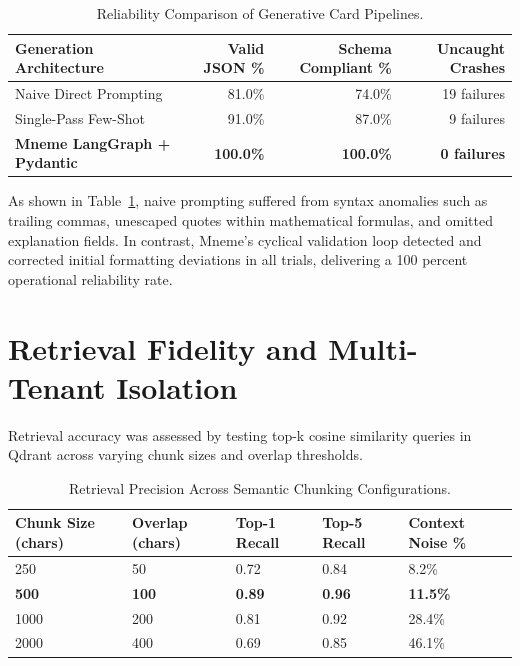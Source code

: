 \documentclass[12pt,a4paper,oneside]{report}
\begin{document}
\begin{table}[H]
\centering
\small
\begin{tabularx}{\textwidth}{Xrrr}
\toprule
\textbf{Generation Architecture} & \textbf{Valid JSON \%} & \textbf{Schema Compliant \%} & \textbf{Uncaught Crashes} \\
\midrule
Naive Direct Prompting & 81.0\% & 74.0\% & 19 failures \\
Single-Pass Few-Shot & 91.0\% & 87.0\% & 9 failures \\
\textbf{Mneme LangGraph + Pydantic} & \textbf{100.0\%} & \textbf{100.0\%} & \textbf{0 failures} \\
\bottomrule
\end{tabularx}
\caption{Reliability Comparison of Generative Card Pipelines.}
\label{tab:schema_reliability}
\end{table}

As shown in Table~\ref{tab:schema_reliability}, naive prompting suffered from syntax anomalies such as trailing commas, unescaped quotes within mathematical formulas, and omitted explanation fields. In contrast, Mneme's cyclical validation loop detected and corrected initial formatting deviations in all trials, delivering a 100 percent operational reliability rate.

\section{Retrieval Fidelity and Multi-Tenant Isolation}
Retrieval accuracy was assessed by testing top-k cosine similarity queries in Qdrant across varying chunk sizes and overlap thresholds.

\begin{table}[H]
\centering
\small
\begin{tabularx}{\textwidth}{XXXXX}
\toprule
\textbf{Chunk Size (chars)} & \textbf{Overlap (chars)} & \textbf{Top-1 Recall} & \textbf{Top-5 Recall} & \textbf{Context Noise \%} \\
\midrule
250 & 50 & 0.72 & 0.84 & 8.2\% \\
\textbf{500} & \textbf{100} & \textbf{0.89} & \textbf{0.96} & \textbf{11.5\%} \\
1000 & 200 & 0.81 & 0.92 & 28.4\% \\
2000 & 400 & 0.69 & 0.85 & 46.1\% \\
\bottomrule
\end{tabularx}
\caption{Retrieval Precision Across Semantic Chunking Configurations.}
\label{tab:chunk_precision}
\end{table}
\end{document}
